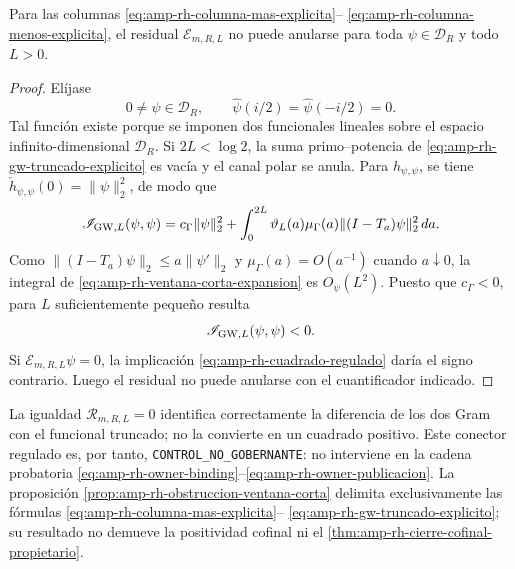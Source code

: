 \begin{proposition}
\label{prop:amp-rh-obstruccion-ventana-corta}
Para las columnas
\eqref{eq:amp-rh-columna-mas-explicita}--
\eqref{eq:amp-rh-columna-menos-explicita}, el residual
\(\mathcal E_{m,R,L}\) no puede anularse para toda
\(\psi\in\mathcal D_R\) y todo \(L>0\).
\end{proposition}

\begin{proof}
Elíjase
\[
 0\ne\psi\in\mathcal D_R,\qquad
 \widehat\psi(i/2)=\widehat\psi(-i/2)=0.
\]
Tal función existe porque se imponen dos funcionales lineales sobre el
espacio infinito-dimensional \(\mathcal D_R\). Si \(2L<\log2\), la suma
primo--potencia de
\eqref{eq:amp-rh-gw-truncado-explicito} es vacía y el canal polar se
anula. Para \(h_{\psi,\psi}\), se tiene
\(\check h_{\psi,\psi}(0)=\|\psi\|_2^2\), de modo que
\begin{equation}\label{eq:amp-rh-ventana-corta-expansion}
 \mathscr I_{{\rm GW},L}(\psi,\psi)
 =c_\Gamma\|\psi\|_2^2+
 \int_0^{2L}\vartheta_L(a)\mu_\Gamma(a)
       \|(I-T_a)\psi\|_2^2\,da .
\end{equation}
Como
\(\|(I-T_a)\psi\|_2\leq a\|\psi'\|_2\) y
\(\mu_\Gamma(a)=O(a^{-1})\) cuando \(a\downarrow0\), la integral de
\eqref{eq:amp-rh-ventana-corta-expansion} es \(O_\psi(L^2)\). Puesto que
\(c_\Gamma<0\), para \(L\) suficientemente pequeño resulta
\[
 \mathscr I_{{\rm GW},L}(\psi,\psi)<0.
\]
Si \(\mathcal E_{m,R,L}\psi=0\), la implicación
\eqref{eq:amp-rh-cuadrado-regulado} daría el signo contrario. Luego el
residual no puede anularse con el cuantificador indicado.
\end{proof}

La igualdad \(\mathcal R_{m,R,L}=0\) identifica correctamente la
diferencia de los dos Gram con el funcional truncado; no la convierte en
un cuadrado positivo. Este conector regulado es, por tanto,
\texttt{CONTROL\_NO\_GOBERNANTE}: no interviene en la cadena probatoria
\eqref{eq:amp-rh-owner-binding}--\eqref{eq:amp-rh-owner-publicacion}. La
proposición \ref{prop:amp-rh-obstruccion-ventana-corta} delimita
exclusivamente las fórmulas
\eqref{eq:amp-rh-columna-mas-explicita}--
\eqref{eq:amp-rh-gw-truncado-explicito}; su resultado no demueve la
positividad cofinal ni el \cref{thm:amp-rh-cierre-cofinal-propietario}.
